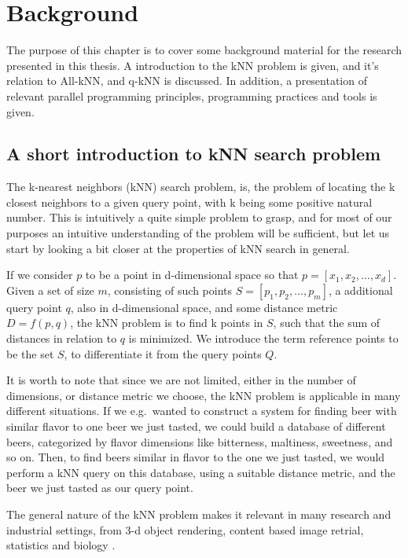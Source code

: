 \chapter{Background}

The purpose of this chapter is to cover some background material for the research presented in this thesis. A introduction to the kNN problem is given, and it's relation to All-kNN, and q-kNN is discussed. In addition, a presentation of relevant parallel programming principles, programming practices and tools is given.

\section{A short introduction to kNN search problem} %
\label{a_short_introduction_to_kNN_search_problem}

The k-nearest neighbors (kNN) search problem, is, the problem of locating the k closest neighbors to a given query point, with k being some positive natural number. This is intuitively a quite simple problem to grasp, and for most of our purposes an intuitive understanding of the problem will be sufficient, but let us start by looking a bit closer at the properties of kNN search in general.

If we consider $p$ to be a point in d-dimensional space so that $p = [x_1, x_2,\dots, x_d]$. Given a set of size $m$, consisting of such points $S = [p_1, p_2,\dots, p_m]$, a additional query point $q$, also in d-dimensional space, and some distance metric $D = f(p, q)$, the kNN problem is to find k points in $S$, such that the sum of distances in relation to $q$ is minimized. We introduce the term reference points to be the set $S$, to differentiate it from the query points $Q$. 

It is worth to note that since we are not limited, either in the number of dimensions, or distance metric we choose, the kNN problem is applicable in many different situations. If we e.g.\ wanted to construct a system for finding beer with similar flavor to one beer we just tasted, we could build a database of different beers, categorized by flavor dimensions like bitterness, maltiness, sweetness, and so on. Then, to find beers similar in flavor to the one we just tasted, we would perform a kNN query on this database, using a suitable distance metric, and the beer we just tasted as our query point.

The general nature of the kNN problem makes it relevant in many research and industrial settings, from 3-d object rendering, content based image retrial, statistics and biology \citep[Introduction]{Garcia2010}.

